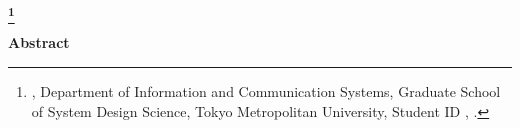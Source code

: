 \newpage
\begin{center}
 \renewcommand{\thefootnote}{\fnsymbol{footnote}}
 \Large\bfseries \etitle\footnote[1]
 {{\edoctitle}, Department of Information and Communication Systems,
 Graduate School of System Design \mbox{Science,}
 Tokyo Metropolitan University,
 {Student ID \studentnumber}, \edate.}
 \renewcommand{\thefootnote}{\arabic{footnote}}
\end{center}
\vspace*{1truemm}
\begin{center}
 \large\eauthor
\end{center}
\vspace*{2truemm}
\begin{center}
 {\bfseries Abstract}
\end{center}
\vspace*{2truemm}
\par
\eabstract

